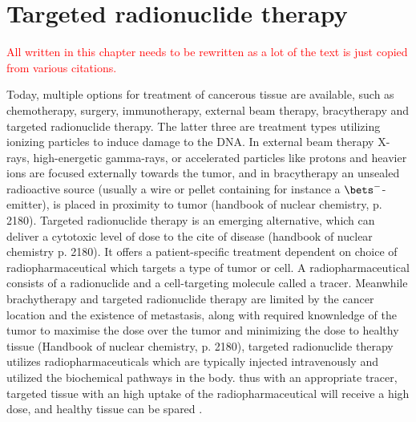 \chapter{Targeted radionuclide therapy}
\textcolor{red}{All written in this chapter needs to be rewritten as a lot of the text is just copied from various citations.}

Today, multiple options for treatment of cancerous tissue are available, such as chemotherapy, surgery, immunotherapy, external beam therapy, bracytherapy and targeted radionuclide therapy. The latter three are treatment types utilizing ionizing particles to induce damage to the DNA. In external beam therapy X-rays, high-energetic gamma-rays, or accelerated particles like protons and heavier ions are focused externally towards the tumor, and in bracytherapy an unsealed radioactive source (usually a wire or pellet containing for instance a $\bets^-$-emitter), is placed in proximity to tumor (handbook of nuclear chemistry, p. 2180). Targeted radionuclide therapy is an emerging alternative, which can deliver a cytotoxic level of dose to the cite of disease (handbook of nuclear chemistry p. 2180). It offers a patient-specific treatment dependent on choice of radiopharmaceutical which targets a type of tumor or cell. A radiopharmaceutical consists of a radionuclide and a cell-targeting molecule called a tracer. Meanwhile brachytherapy and targeted radionuclide therapy are limited by the cancer location and the existence of metastasis, along with required knownledge of the tumor to maximise the dose over the tumor and minimizing the dose to healthy tissue (Handbook of nuclear chemistry, p. 2180), targeted radionuclide therapy utilizes radiopharmaceuticals which are typically injected intravenously and utilized the biochemical pathways in the body. thus with an appropriate tracer, targeted tissue with an high uptake of the radiopharmaceutical will receive a high dose, and healthy tissue can be spared \cite{Yeong2014a}.\\ 

